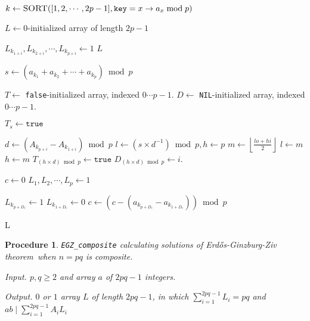 \documentclass[11pt]{article}
\newtheorem{procedure}{Procedure}
\newcommand{\EGZT}{Erd\H{o}s-Ginzburg-Ziv theorem}
\begin{document}
\begin{algorithmic}[1]


    \State $k \gets \Call{SORT}{[1, 2, \cdots, 2p-1], \texttt{key} = x \rightarrow a_x \bmod p}$
    
    \State $L \gets 0$-initialized array of length $2p-1$
    
            \State $L_{k_{1+i}}, L_{k_{2+i}}, \cdots,  L_{k_{p+i}} \gets 1$
            \State \Return $L$
        \EndIf
    \EndFor
    
    \State $s \gets (a_{k_1} + a_{k_2}+ \cdots + a_{k_p}) \bmod p$
    
    \State $T \gets$ \texttt{false}-initialized array, indexed $0 \cdots {p-1}$.
    \State $D \gets$ \texttt{NIL}-initialized array, indexed $0 \cdots {p-1}$.
    
    \State $T_s \gets \texttt{true}$
    
    
        \State $d \gets (A_{k_{p+i}} - A_{k_{1+i}}) \bmod p$
        \State $l \gets (s \times d^{-1}) \bmod p, h \gets p$
            \State $m \gets \left\lfloor \frac{lo+hi}{2} \right\rfloor$
                \State $l \gets m$
            \Else 
                \State $h \gets m$
            \EndIf
        \State $T_{(h \times d) \bmod p} \gets \texttt{true}$
        \State $D_{(h \times d) \bmod p} \gets i$.
        \EndWhile
    \EndWhile
    
    \State $c \gets 0$
    \State $L_1, L_2, \cdots, L_p \gets 1$
    
        \State $L_{k_{p+D_c}} \gets 1$
        \State $L_{k_{1+D_c}} \gets 0$
        \State $c \gets (c - (a_{k_{p+D_c}}-a_{k_{1+D_c}})) \bmod p $
    \EndWhile
    
    \State \Return L

\EndFunction



\end{algorithmic}


\begin{procedure} \texttt{EGZ\_composite} calculating solutions of \EGZT\ when $n=pq$ is composite.

Input. $p, q \ge 2$ and array $a$ of $2pq-1$ integers.

Output. $0$ or $1$ array $L$ of length $2pq-1$, in which $\sum_{i=1}^{2pq-1} {L}_{i} = pq$ and $ab \mid \sum_{i=1}^{2pq-1} {A}_{i}{L}_{i}$


\end{procedure}
\end{document}
